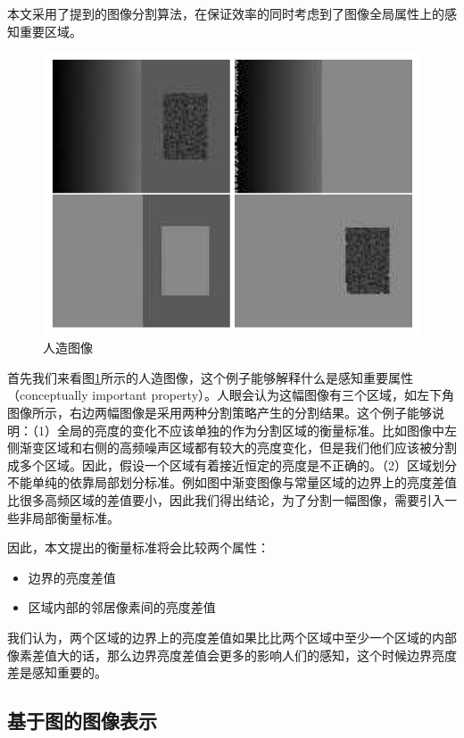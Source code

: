本文采用了\cite{Felzenszwalb:2004il}提到的图像分割算法，在保证效率的同时考虑到了图像全局属性上的感知重要区域。

\begin{figure}
\centering\includegraphics[width=15cm]{imgs/ch2/man_made}
\caption{人造图像}
\label{fig:man_made}
\end{figure}
首先我们来看图\ref{fig:man_made}所示的人造图像，这个例子能够解释什么是感知重要属性（conceptually important property）。人眼会认为这幅图像有三个区域，如左下角图像所示，右边两幅图像是采用两种分割策略产生的分割结果。这个例子能够说明：（1）全局的亮度的变化不应该单独的作为分割区域的衡量标准。比如图像中左侧渐变区域和右侧的高频噪声区域都有较大的亮度变化，但是我们他们应该被分割成多个区域。因此，假设一个区域有着接近恒定的亮度是不正确的。（2）区域划分不能单纯的依靠局部划分标准。例如图中渐变图像与常量区域的边界上的亮度差值比很多高频区域的差值要小，因此我们得出结论，为了分割一幅图像，需要引入一些非局部衡量标准。

因此，本文提出的衡量标准将会比较两个属性：
\begin{itemize}
\item 边界的亮度差值
\item 区域内部的邻居像素间的亮度差值
\end{itemize}
我们认为，两个区域的边界上的亮度差值如果比比两个区域中至少一个区域的内部像素差值大的话，那么边界亮度差值会更多的影响人们的感知，这个时候边界亮度差是感知重要的。

\subsection{基于图的图像表示}

